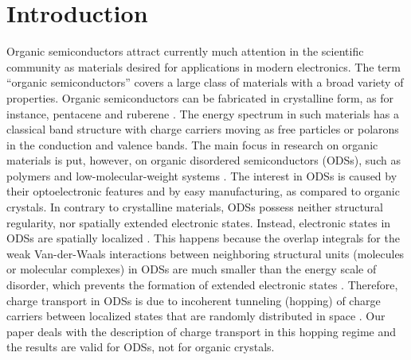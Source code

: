 \documentclass[aps,reprint,amsmath,amssymb,superscriptaddress,showpacs,prb]{revtex4-1}
\begin{document}
\section{Introduction}

Organic semiconductors attract currently much attention in the scientific community as materials desired for applications in modern electronics. The term “organic semiconductors” covers a large class of materials with a broad variety of properties. Organic semiconductors can be fabricated in crystalline form, as for instance, pentacene and ruberene \cite{Ostroverkhova2016}. The energy spectrum in such materials has a classical band structure with charge carriers moving as free particles or polarons in the conduction and valence bands. The main focus in research on organic materials is put, however, on organic disordered semiconductors (ODSs), such as polymers and low-molecular-weight systems \cite{Silinsh1970,Bassler1993,Bassler1981,Borsenberger1993,Auweraer1994,Pope1999,Hadziioannou2000,Brabec2003,Bruetting2005,Baranovski2006,Schwoerer2007,Sun2008,Tessler2009,Meller2010,Geoghegan_2013,Baranovskii2014,Kuik2014,Anna_Heinz_2015,Nenashev_Topical_2015,Laquai2015}. The interest in ODSs is caused by their optoelectronic features and by easy manufacturing, as compared to organic crystals. In contrary to crystalline materials, ODSs possess neither structural regularity, nor spatially extended electronic states. Instead, electronic states in ODSs are spatially localized \cite{Silinsh1970,Bassler1981,Bassler1993,Borsenberger1993,Auweraer1994,Pope1999,Hadziioannou2000,Brabec2003,Bruetting2005,Baranovski2006,Schwoerer2007,Sun2008,Tessler2009,Meller2010,Geoghegan_2013,Baranovskii2014,Kuik2014,Anna_Heinz_2015,Nenashev_Topical_2015,Laquai2015}.  This happens because the overlap integrals for the weak Van-der-Waals interactions between neighboring structural units  (molecules or molecular complexes) in ODSs are much smaller than the energy scale of disorder, which prevents the formation of extended electronic states \cite{Silinsh1970,Bassler1981,Bassler1993}.   Therefore, charge transport in ODSs is due to incoherent tunneling (hopping) of charge carriers between localized states that are randomly distributed in space \cite{Silinsh1970,Bassler1981,Bassler1993,Borsenberger1993,Auweraer1994,Pope1999,Hadziioannou2000,Brabec2003,Bruetting2005,Baranovski2006,Schwoerer2007,Sun2008,Tessler2009,Meller2010,Geoghegan_2013,Baranovskii2014,Kuik2014,Anna_Heinz_2015,Nenashev_Topical_2015,Laquai2015}. Our paper deals with the description of charge transport in this hopping regime and the results are valid for ODSs, not for organic crystals.
\end{document}
